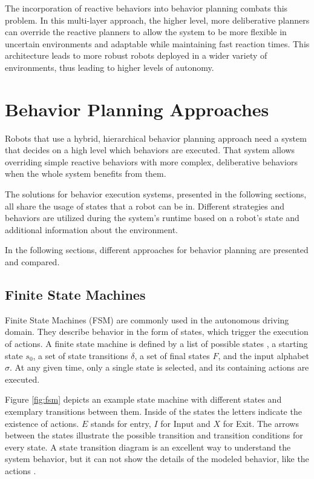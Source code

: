 The incorporation of reactive behaviors into behavior planning combats this problem. In this multi-layer approach, the higher level, more deliberative planners can override the reactive planners to allow the system to be more flexible in uncertain environments and adaptable while maintaining fast reaction times. This architecture leads to more robust robots deployed in a wider variety of environments, thus leading to higher levels of autonomy.

\section{Behavior Planning Approaches}
\label{sec:Behavior Planning Approaches}

Robots that use a hybrid, hierarchical behavior planning approach need a system that decides on a high level which behaviors are executed. That system allows overriding simple reactive behaviors with more complex, deliberative behaviors when the whole system benefits from them. 

The solutions for behavior execution systems, presented in the following sections, all share the usage of states that a robot can be in. Different strategies and behaviors are utilized during the system's runtime based on a robot's state and additional information about the environment. 

In the following sections, different approaches for behavior planning are presented and compared.

\subsection{Finite State Machines}

Finite State Machines (FSM) are commonly used in the autonomous driving domain. They describe behavior in the form of states, which trigger the execution of actions. A finite state machine is defined by a list of possible states \textit{}, a starting state $s_{0}$, a set of state transitions $\delta$, a set of final states $F$, and the input alphabet $\sigma$. At any given time, only a single state is selected, and its containing actions are executed. 

Figure \ref{fig:fsm} depicts an example state machine with different states and exemplary transitions between them. Inside of the states the letters indicate the existence of actions. $E$ stands for entry, $I$ for Input and $X$ for Exit. The arrows between the states illustrate the possible transition and transition conditions for every state. A state transition diagram is an excellent way to understand the system behavior, but it can not show the details of the modeled behavior, like the actions \cite{wagner2006}. 

